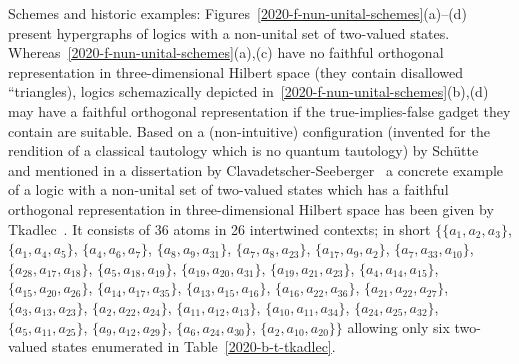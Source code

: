 Schemes and historic examples:
Figures~\ref{2020-f-nun-unital-schemes}(a)--(d) present hypergraphs of logics with a non-unital set of two-valued states.
Whereas~\ref{2020-f-nun-unital-schemes}(a),(c) have no faithful orthogonal representation in three-dimensional Hilbert space
(they contain disallowed ``triangles), logics schemazically depicted in~\ref{2020-f-nun-unital-schemes}(b),(d) may have
a faithful orthogonal representation if the true-implies-false gadget they contain are suitable.
Based on a (non-intuitive) configuration (invented for the rendition of a classical tautology which is no quantum tautology)
by Sch{\"u}tte~\cite{Schuette} and mentioned in a dissertation by Clavadetscher-Seeberger~\cite{clavadetscher}
a concrete example of a logic with a non-unital set of two-valued states which has a faithful orthogonal representation in three-dimensional Hilbert space
has been given by Tkadlec~\cite[Figure~2, p.~207]{tkadlec-96}.
It consists of 36 atoms in 26 intertwined contexts; in short
 $\{\{ a_{ 1}, a_{ 2}, a_{ 3} \}$,
 $\{ a_{ 1}, a_{ 4}, a_{ 5} \}$,
 $\{ a_{ 4}, a_{ 6}, a_{ 7} \}$,
 $\{ a_{ 8}, a_{ 9}, a_{31} \}$,
 $\{ a_{ 7}, a_{ 8}, a_{23} \}$,
 $\{ a_{17}, a_{ 9}, a_{ 2} \}$,
 $\{ a_{ 7}, a_{33}, a_{10} \}$,
 $\{ a_{28}, a_{17}, a_{18} \}$,
 $\{ a_{ 5}, a_{18}, a_{19} \}$,
 $\{ a_{19}, a_{20}, a_{31} \}$,
 $\{ a_{19}, a_{21}, a_{23} \}$,
 $\{ a_{ 4}, a_{14}, a_{15} \}$,
 $\{ a_{15}, a_{20}, a_{26} \}$,
 $\{ a_{14}, a_{17}, a_{35} \}$,
 $\{ a_{13}, a_{15}, a_{16} \}$,
 $\{ a_{16}, a_{22}, a_{36} \}$,
 $\{ a_{21}, a_{22}, a_{27} \}$,
 $\{ a_{ 3}, a_{13}, a_{23} \}$,
 $\{ a_{ 2}, a_{22}, a_{24} \}$,
 $\{ a_{11}, a_{12}, a_{13} \}$,
 $\{ a_{10}, a_{11}, a_{34} \}$,
 $\{ a_{24}, a_{25}, a_{32} \}$,
 $\{ a_{ 5}, a_{11}, a_{25} \}$,
 $\{ a_{ 9}, a_{12}, a_{29} \}$,
 $\{ a_{ 6}, a_{24}, a_{30} \}$,
 $\{ a_{ 2}, a_{10}, a_{20} \}\}$
allowing only six two-valued states enumerated in Table~\ref{2020-b-t-tkadlec}.
